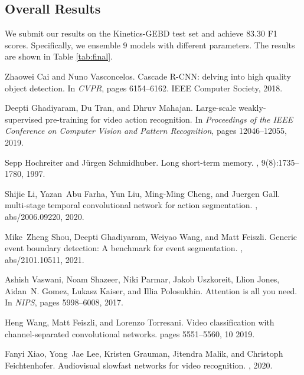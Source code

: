 \documentclass[final]{cvpr}
\begin{document}
\subsection{Overall Results}
We submit our results on the Kinetics-GEBD test set and achieve $83.30$ F1 scores. Specifically, we ensemble $9$ models with different parameters. The results are shown in Table \ref{tab:final}. 







{\small

\begin{thebibliography}{1}\itemsep=-1pt

Zhaowei Cai and Nuno Vasconcelos.
\newblock Cascade {R-CNN:} delving into high quality object detection.
\newblock In {\em CVPR}, pages 6154--6162. {IEEE} Computer Society, 2018.

Deepti Ghadiyaram, Du Tran, and Dhruv Mahajan.
\newblock Large-scale weakly-supervised pre-training for video action
  recognition.
\newblock In {\em Proceedings of the IEEE Conference on Computer Vision and
  Pattern Recognition}, pages 12046--12055, 2019.

Sepp Hochreiter and J{\"{u}}rgen Schmidhuber.
\newblock Long short-term memory.
, 9(8):1735--1780, 1997.

Shijie Li, Yazan~Abu Farha, Yun Liu, Ming{-}Ming Cheng, and Juergen Gall.
 multi-stage temporal convolutional network for action
  segmentation.
, abs/2006.09220, 2020.

Mike~Zheng Shou, Deepti Ghadiyaram, Weiyao Wang, and Matt Feiszli.
\newblock Generic event boundary detection: {A} benchmark for event
  segmentation.
, abs/2101.10511, 2021.

Ashish Vaswani, Noam Shazeer, Niki Parmar, Jakob Uszkoreit, Llion Jones,
  Aidan~N. Gomez, Lukasz Kaiser, and Illia Polosukhin.
\newblock Attention is all you need.
\newblock In {\em NIPS}, pages 5998--6008, 2017.

Heng Wang, Matt Feiszli, and Lorenzo Torresani.
\newblock Video classification with channel-separated convolutional networks.
\newblock pages 5551--5560, 10 2019.

Fanyi Xiao, Yong~Jae Lee, Kristen Grauman, Jitendra Malik, and Christoph
  Feichtenhofer.
\newblock Audiovisual slowfast networks for video recognition.
, 2020.

\end{thebibliography}
 }
\end{document}
